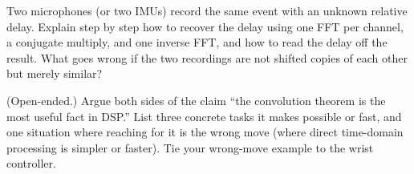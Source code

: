 \begin{exercise}
Two microphones (or two IMUs) record the same event with an unknown relative
delay. Explain step by step how to recover the delay using one FFT per channel,
a conjugate multiply, and one inverse FFT, and how to read the delay off the
result. What goes wrong if the two recordings are not shifted copies of
each other but merely similar?
\end{exercise}

\begin{exercise}
(Open-ended.) Argue both sides of the claim ``the convolution theorem is the most
useful fact in DSP.'' List three concrete tasks it makes possible or fast, and
one situation where reaching for it is the wrong move (where direct time-domain
processing is simpler or faster). Tie your wrong-move example to the wrist
controller.
\end{exercise}
